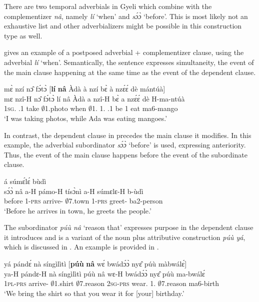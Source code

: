 There are two temporal adverbials in Gyeli which combine with the complementizer {\itshape nâ}, namely {\itshape lí} `when' and {\itshape sɔ́ɔ̀} `before'. This is most likely not an exhaustive list and other adverbializers might be possible in this construction type as well.

 gives an example of a postposed adverbial + complementizer clause, using the adverbial {\itshape lí} `when'. Semantically, the sentence expresses simultaneity, the event of the main clause happening at the same time as the event of the dependent clause.


\ea\label{TEMP1}
  \glll mɛ̀ nzí nɔ̂ fɔ́tɔ̀ [{\bfseries lí} {\bfseries nâ} Àdà à nzí bɛ̀ à nzɛ́ɛ́ dè mántúà]  \\
        mɛ nzî-H nɔ̂ fɔ́tɔ̀ {\db}lí nâ Àdà a nzî-H bɛ̀ a nzɛ́ɛ́ dè H-ma-ntúà  \\
         1\textsc{sg}.{\PST} {\PROG}.{\PST}1 take $\emptyset$1.photo {\db}when {\COMP} $\emptyset$1.{\PN} 1.{\PST} {\PROG}.{\PST}1 be 1 {\PROG} eat ma6-mango \\
    \trans `I was taking photos, while Ada was eating mangoes.'
\z

In contrast, the dependent clause in  precedes the main clause it modifies. In this example, the adverbial subordinator {\itshape sɔ́ɔ̀} `before' is used, expressing anteriority. Thus, the event of the main clause happens before the event of the subordinate clause.


\ea\label{TEMP2}
   á súmɛ́lɛ́ bùdì\\
        {\db}sɔ́ɔ̀ nâ a-H pámo-H tísɔ̀nì a-H súmɛlɛ-H b-ùdì\\
         {\db}before {\COMP} 1-\textsc{prs} arrive-{\R} $\emptyset$7.town 1-\textsc{prs} greet-{\R} ba2-person\\
    \trans `Before he arrives in town, he greets the people.'
\z


The subordinator {\itshape púù nâ} `reason that' expresses purpose in the dependent clause it introduces and is a variant of the noun plus attributive construction {\itshape púù yá}, which is discussed in .  An example is provided in .


\ea\label{puuna} 
  \glll  yá pándɛ́ nà síngìlìtì [{\bfseries púù} {\bfseries nâ} wɛ́ bwádɔ́ɔ̀ nyɛ̂ púù màbwálɛ́]\\
         ya-H pándɛ-H nà síngìlìtì {\db}púù nâ wɛ-H bwádɔ́ɔ̀ nyɛ̂ púù ma-bwálɛ́\\
         1\textsc{pl}-\textsc{prs} arrive-{\R} {\COM} $\emptyset$1.shirt {\db}$\emptyset$7.reason {\COMP} 2\textsc{sg}-\textsc{prs} wear.{\SBJV} 1.{\OBJ} $\emptyset$7.reason ma6-birth\\
    \trans `We bring the shirt so that you wear it for [your] birthday.'
\z

